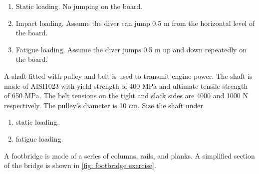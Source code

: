 \documentclass[
10pt,
a4paper,
openany,
svgnames,
]{book}
\newcommand{\exercise}{%
\item \label{lab:\arabic{chapter}-\arabic{exercisesi}}  %
}
\begin{document}
\begin{exercises}
  \begin{enumerate}
  \item Static loading. No jumping on the board.
  \item Impact loading. Assume the diver can jump 0.5 m from the horizontal level of the board.
  \item Fatigue loading. Assume the diver jumps 0.5 m up and down repeatedly on the board.
  \end{enumerate}
  
  \exercise A shaft fitted with pulley and belt is used to transmit engine power. The shaft is made of AISI1023 with yield strength of 400 MPa and ultimate tensile strength of 650 MPa. The belt tensions on the tight and slack sides are 4000 and 1000 N respectively. The pulley’s diameter is 10 cm. Size the shaft under

  \begin{figure}[H]
    \centering
  \end{figure}
  
  \begin{enumerate}
  \item static loading.
  \item fatigue loading.
  \end{enumerate}

  \exercise \label{exercise: footbridge} A footbridge is made of a series of columns, rails, and planks. A simplified section of the bridge is shown in \cref{fig: footbridge exercise}.


\end{exercises}
\end{document}

